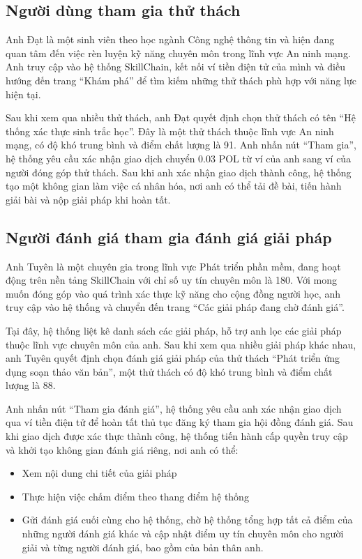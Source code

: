 \subsection{Người dùng tham gia thử thách}

Anh Đạt là một sinh viên theo học ngành Công nghệ thông tin và hiện đang quan tâm đến việc rèn luyện kỹ năng chuyên môn trong lĩnh vực An ninh mạng. 
Anh truy cập vào hệ thống SkillChain, kết nối ví tiền điện tử của mình và điều hướng đến trang ``Khám phá'' để tìm kiếm những thử thách phù hợp với năng lực hiện tại.

Sau khi xem qua nhiều thử thách, anh Đạt quyết định chọn thử thách có tên ``Hệ thống xác thực sinh trắc học''. Đây là một thử thách thuộc lĩnh vực An ninh mạng, có độ khó trung bình và điểm chất lượng là 91.
Anh nhấn nút ``Tham gia'', hệ thống yêu cầu xác nhận giao dịch chuyển 0.03 POL từ ví của anh sang ví của người đóng góp thử thách. 
Sau khi anh xác nhận giao dịch thành công, hệ thống tạo một không gian làm việc cá nhân hóa, nơi anh có thể tải đề bài, tiến hành giải bài và nộp giải pháp khi hoàn tất.

\subsection{Người đánh giá tham gia đánh giá giải pháp}

Anh Tuyên là một chuyên gia trong lĩnh vực Phát triển phần mềm, đang hoạt động trên nền tảng SkillChain với chỉ số uy tín chuyên môn là 180. 
Với mong muốn đóng góp vào quá trình xác thực kỹ năng cho cộng đồng người học, anh truy cập vào hệ thống và chuyển đến trang ``Các giải pháp đang chờ đánh giá''.

Tại đây, hệ thống liệt kê danh sách các giải pháp, hỗ trợ anh lọc các giải pháp thuộc lĩnh vực chuyên môn của anh. 
Sau khi xem qua nhiều giải pháp khác nhau, anh Tuyên quyết định chọn đánh giá giải pháp của thử thách ``Phát triển ứng dụng soạn thảo văn bản'', một thử thách có độ khó trung bình và điểm chất lượng là 88.

Anh nhấn nút ``Tham gia đánh giá'', hệ thống yêu cầu anh xác nhận giao dịch qua ví tiền điện tử để hoàn tất thủ tục đăng ký tham gia hội đồng đánh giá. 
Sau khi giao dịch được xác thực thành công, hệ thống tiến hành cấp quyền truy cập và khởi tạo không gian đánh giá riêng, nơi anh có thể:

\begin{itemize}
  \item Xem nội dung chi tiết của giải pháp
  \item Thực hiện việc chấm điểm theo thang điểm hệ thống
  \item Gửi đánh giá cuối cùng cho hệ thống, chờ hệ thống tổng hợp tất cả điểm của những người đánh giá khác và cập nhật điểm uy tín chuyên môn cho người giải và từng người đánh giá, bao gồm của bản thân anh.
\end{itemize}

